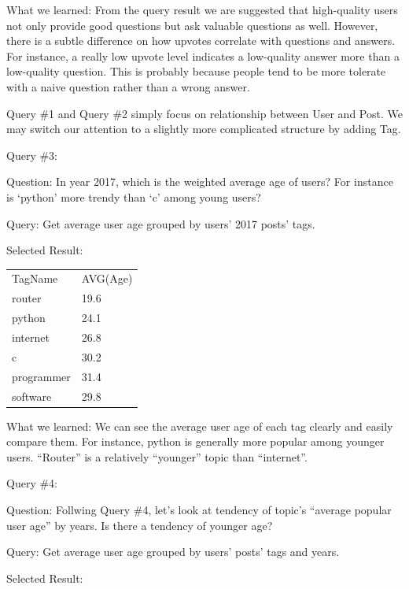 What we learned:	From the query result we are suggested that high-quality users not only provide good questions but ask valuable questions as well. However, there is a subtle difference on how upvotes correlate with questions and answers. For instance, a really low upvote level indicates a low-quality answer more than a low-quality question. This is probably because people tend to be more tolerate with a naive question rather than a wrong answer. 

Query \#1 and Query \#2 simply focus on relationship between User and Post. We may switch our attention to a slightly more complicated structure by adding Tag.

Query \#3:

Question: 	In year 2017, which is the weighted average age of users? For instance is ‘python’ more trendy than ‘c’ among young users? 

Query: 		Get average user age grouped by users’ 2017 posts’ tags. 

Selected Result:

\begin {center}
\begin{tabular}{ l l  }
	
	TagName&AVG(Age)\\router&19.6\\python&24.1\\internet&26.8\\c&30.2\\programmer&31.4\\software&29.8\\
	
\end{tabular}
\end {center}



What we learned:	We can see the average user age of each tag clearly and easily compare them. For instance, python is generally more popular among younger users. ``Router'' is a relatively ``younger'' topic than ``internet''. 

Query \#4:

Question: 	Follwing Query \#4, let’s look at tendency of topic’s ``average popular user age'' by years. Is there a tendency of younger age?

Query: 		Get average user age grouped by users’ posts’ tags and years. 

Selected Result:

